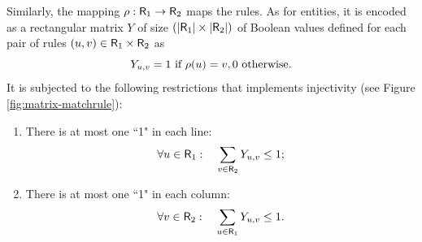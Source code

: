\documentclass[a4paper,twoside]{article}
\begin{document}
Similarly, the mapping $\rho: \mathsf{R}_1 \to \mathsf{R}_2$ maps the rules. As for entities, it is encoded as a rectangular matrix $Y$ of size $(|\mathsf{R}_1| \times |\mathsf{R}_2|)$ of Boolean values defined for each pair of rules $(u,v)\in \mathsf{R}_1 \times \mathsf{R}_2$  as
$$Y_{u,v} =1 \text{ if } \rho(u)=v, 0 \text{ otherwise.}$$
It is subjected to the following restrictions that implements injectivity (see Figure \ref{fig:matrix-matchrule}):
\begin{enumerate}
\item There is at most one ``1" in  each line:~
$$
 \forall u \in \mathsf{R}_1: \quad
   \sum_{v \in \mathsf{R}_2} Y_{u,v} \leq 1;
  $$
  
 \item There is at most one ``1" in  each column: ~ 
$$
  \forall v \in \mathsf{R}_2: \quad
  \sum_{u \in \mathsf{R}_1} Y_{u,v} \leq 1. 
  $$
\end{enumerate}

\end{document}
